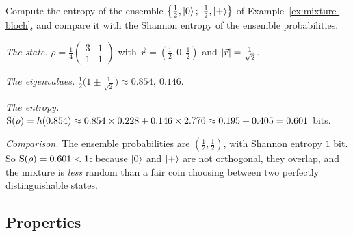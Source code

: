 \begin{example}\label{ex:vn-mixture}
  Compute the entropy of the ensemble $\bigl\{\tfrac12,\ket0;\ \tfrac12,\ket+\bigr\}$ of Example~\ref{ex:mixture-bloch}, and compare it with the Shannon entropy of the ensemble probabilities.
\end{example}
\begin{solution}
  \begin{steps}
    \item \emph{The state.} $\rho=\tfrac14\begin{pmatrix}3&1\\1&1\end{pmatrix}$ with $\vec r=(\tfrac12,0,\tfrac12)$ and $\left|\vec r\right|=\tfrac1{\sqrt2}$.
    \item \emph{The eigenvalues.} $\tfrac12\bigl(1\pm\tfrac1{\sqrt2}\bigr)\approx0.854,\ 0.146$.
    \item \emph{The entropy.} $\mathrm{S}(\rho)=h(0.854)\approx0.854\times0.228+0.146\times2.776\approx0.195+0.405=0.601$ bits.
    \item \emph{Comparison.} The ensemble probabilities are $(\tfrac12,\tfrac12)$, with Shannon entropy $1$ bit. So $\mathrm{S}(\rho)=0.601<1$: because $\left|0\right\rangle$ and $\left|+\right\rangle$ are not orthogonal, they overlap, and the mixture is \emph{less} random than a fair coin choosing between two perfectly distinguishable states.
  \end{steps}
\end{solution}

\subsection{Properties}

